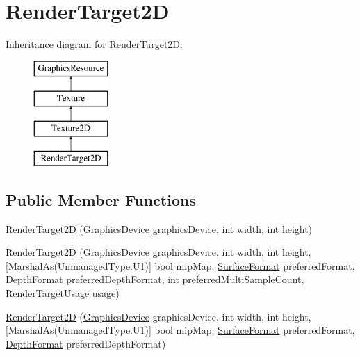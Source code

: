 \hypertarget{classMicrosoft_1_1Xna_1_1Framework_1_1Graphics_1_1RenderTarget2D}{}\section{Render\+Target2\+D}
\label{classMicrosoft_1_1Xna_1_1Framework_1_1Graphics_1_1RenderTarget2D}
Inheritance diagram for Render\+Target2\+D\+:\begin{figure}[H]
\begin{center}
\leavevmode
\includegraphics[height=4.000000cm]{classMicrosoft_1_1Xna_1_1Framework_1_1Graphics_1_1RenderTarget2D}
\end{center}
\end{figure}
\subsection*{Public Member Functions}
\begin{DoxyCompactItemize}
\item 
\hyperlink{classMicrosoft_1_1Xna_1_1Framework_1_1Graphics_1_1RenderTarget2D_acccad50daed08d9a3e7c63d2d94f27a8}{Render\+Target2\+D} (\hyperlink{classMicrosoft_1_1Xna_1_1Framework_1_1Graphics_1_1GraphicsDevice}{Graphics\+Device} graphics\+Device, int width, int height)
\item 
\hyperlink{classMicrosoft_1_1Xna_1_1Framework_1_1Graphics_1_1RenderTarget2D_a541114f3488b131284c7080ac83a2a5d}{Render\+Target2\+D} (\hyperlink{classMicrosoft_1_1Xna_1_1Framework_1_1Graphics_1_1GraphicsDevice}{Graphics\+Device} graphics\+Device, int width, int height, \mbox{[}Marshal\+As(Unmanaged\+Type.\+U1)\mbox{]} bool mip\+Map, \hyperlink{namespaceMicrosoft_1_1Xna_1_1Framework_1_1Graphics_a2c30f3edaf443866b3c9b240306fdcc9}{Surface\+Format} preferred\+Format, \hyperlink{namespaceMicrosoft_1_1Xna_1_1Framework_1_1Graphics_a58f3efeaff747e9458455047ca7c9b6c}{Depth\+Format} preferred\+Depth\+Format, int preferred\+Multi\+Sample\+Count, \hyperlink{namespaceMicrosoft_1_1Xna_1_1Framework_1_1Graphics_ac979f67afb63f805fe768e7064c74526}{Render\+Target\+Usage} usage)
\item 
\hyperlink{classMicrosoft_1_1Xna_1_1Framework_1_1Graphics_1_1RenderTarget2D_a68ef7e7703e54c6ed71fad7420ab69e6}{Render\+Target2\+D} (\hyperlink{classMicrosoft_1_1Xna_1_1Framework_1_1Graphics_1_1GraphicsDevice}{Graphics\+Device} graphics\+Device, int width, int height, \mbox{[}Marshal\+As(Unmanaged\+Type.\+U1)\mbox{]} bool mip\+Map, \hyperlink{namespaceMicrosoft_1_1Xna_1_1Framework_1_1Graphics_a2c30f3edaf443866b3c9b240306fdcc9}{Surface\+Format} preferred\+Format, \hyperlink{namespaceMicrosoft_1_1Xna_1_1Framework_1_1Graphics_a58f3efeaff747e9458455047ca7c9b6c}{Depth\+Format} preferred\+Depth\+Format)
\end{DoxyCompactItemize}
